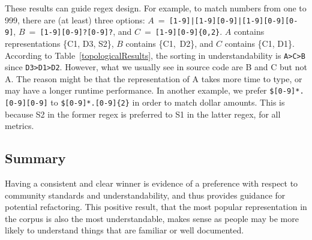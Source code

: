 These results can guide regex design.
For example, to match numbers from one to 999, there are (at least) three options: $A$~=~{\tt [1-9]|[1-9][0-9]|[1-9][0-9][0-9]}, $B$~=~{\tt [1-9][0-9]?[0-9]?}, and $C$~=~{\tt [1-9][0-9]\{0,2\}}.
$A$ contains representations \{C1, D3, S2\}, $B$ contains \{C1,~D2\}, and $C$ contains \{C1, D1\}. %
According to Table~\ref{topologicalResults}, the sorting in understandability is \texttt{A\textgreater C\textgreater B} since \texttt{D3\textgreater D1\textgreater D2}. However, what we usually see in source code are B and C but not A. The reason might be that the representation of A takes more time to type, or may have a longer runtime performance.
In another example, we prefer {\tt \$[0-9]*.[0-9][0-9]} to {\tt \$[0-9]*.[0-9]\{2\}} in order to match dollar amounts. This is because S2 in the former regex is preferred to S1 in the latter regex, for all metrics.
%

\subsection{Summary}
Having a consistent and clear winner is evidence of a preference with respect to community standards and understandability, and thus provides guidance for potential refactoring.
This positive result, that the most popular representation in the corpus is also the most understandable, makes sense as people may be more likely to understand things that are familiar or well documented.
